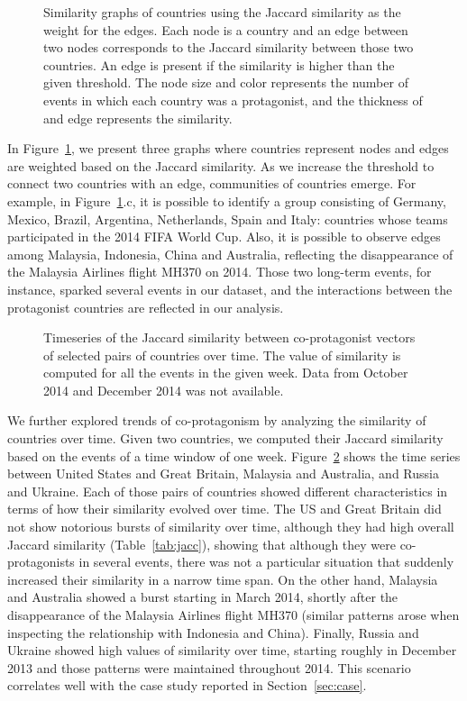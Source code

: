 \begin{figure}[t]
    \centering
    \caption{Similarity graphs of countries using the Jaccard similarity
    as the weight for the edges. Each node is a country and an edge
    between two nodes corresponds to the Jaccard similarity between
    those two countries. An edge is present if the similarity is
    higher than the given threshold. The node size and color
    represents the number of events in which each country was a protagonist, and
    the thickness of and edge represents the similarity.}\label{fig:sim-graph}
\end{figure}

In Figure~\ref{fig:sim-graph}, we present three graphs where countries
represent nodes and edges are weighted based on the Jaccard similarity. As we
increase the threshold to connect two countries with an edge, communities of countries
emerge. For example, in Figure~\ref{fig:sim-graph}.c, it is possible to identify
a group
consisting of Germany, Mexico, Brazil, Argentina, Netherlands, Spain
and Italy: countries whose teams participated in the 2014 FIFA World
Cup. Also, it is possible to observe edges among
Malaysia, Indonesia, China and Australia, reflecting the disappearance of
the Malaysia Airlines flight MH370 on 2014. Those two long-term
events, for instance, sparked several events in our dataset, and the
interactions between the protagonist countries are reflected in our
analysis.

\begin{figure}[t]
    \centering
    \caption{Timeseries of the Jaccard similarity between co-protagonist vectors of
  selected pairs of countries over time. The value of similarity
  is computed for all the events in the given week. Data from
  October 2014 and December 2014 was not
  available.}\label{fig:time-series}
\end{figure}

We further explored trends of co-protagonism by analyzing the
similarity of countries over time. Given two countries, we computed
their Jaccard similarity based on the events of a time window
of one week. Figure~\ref{fig:time-series} shows the time series
between United States and Great Britain, Malaysia and Australia, and
Russia and Ukraine. Each of those pairs of countries showed different
characteristics in terms of how their similarity evolved over
time. The US and Great Britain did not show notorious bursts of
similarity over time, although they had high
overall Jaccard similarity (Table~\ref{tab:jacc}), showing that although they
were
co-protagonists in several events, there was not a particular situation
that suddenly increased their similarity in a narrow time span.
On the other hand, Malaysia and Australia showed a burst starting in
March 2014, shortly after the disappearance of the Malaysia Airlines
flight MH370 (similar patterns arose when inspecting the relationship
with Indonesia and China). Finally, Russia and Ukraine showed high
values of similarity over time, starting roughly in December 2013 and
those patterns were maintained throughout 2014. This scenario
correlates well with the case study reported in Section~\ref{sec:case}.\\


